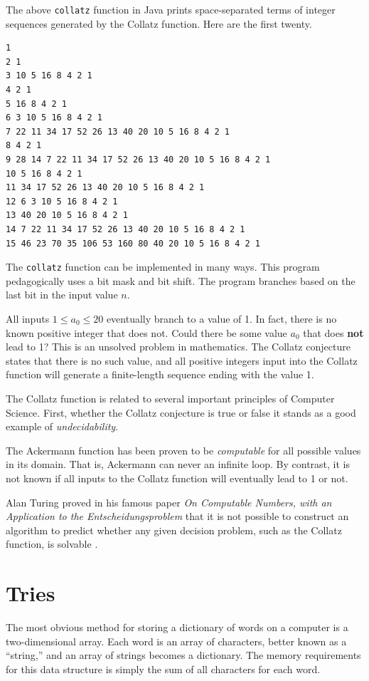 \documentclass{book}
\begin{document}
The above \texttt{collatz} function in Java prints space-separated terms of integer sequences generated by the Collatz function. Here are the first twenty.

\begin{lstlisting}
1 
2 1 
3 10 5 16 8 4 2 1 
4 2 1 
5 16 8 4 2 1 
6 3 10 5 16 8 4 2 1 
7 22 11 34 17 52 26 13 40 20 10 5 16 8 4 2 1 
8 4 2 1 
9 28 14 7 22 11 34 17 52 26 13 40 20 10 5 16 8 4 2 1 
10 5 16 8 4 2 1 
11 34 17 52 26 13 40 20 10 5 16 8 4 2 1 
12 6 3 10 5 16 8 4 2 1 
13 40 20 10 5 16 8 4 2 1 
14 7 22 11 34 17 52 26 13 40 20 10 5 16 8 4 2 1 
15 46 23 70 35 106 53 160 80 40 20 10 5 16 8 4 2 1 
\end{lstlisting}

The \texttt{collatz} function can be implemented in many ways. This program pedagogically uses a bit mask and bit shift. The program branches based on the last bit in the input value $n$.

All inputs $1 \le a_0 \le 20$ eventually branch to a value of 1. In fact, there is no known positive integer that does not. Could there be some value $a_0$ that does \textbf{not} lead to 1? This is an unsolved problem in mathematics. The Collatz conjecture states that there is no such value, and all positive integers input into the Collatz function will generate a finite-length sequence ending with the value 1.

The Collatz function is related to several important principles of Computer Science. First, whether the Collatz conjecture is true or false it stands as a good example of \textit{undecidability}. 

The Ackermann function has been proven to be \textit{computable} for all possible values in its domain. That is, Ackermann can never an infinite loop. By contrast, it is not known if all inputs to the Collatz function will eventually lead to 1 or not.

Alan Turing proved in his famous paper \textit{On Computable Numbers, with an Application to the Entscheidungsproblem} that it is not possible to construct an algorithm to predict whether any given decision problem, such as the Collatz function, is solvable \cite{turing1937computable}.

\chapter{Tries}

The most obvious method for storing a dictionary of words on a computer is a two-dimensional array. Each word is an array of characters, better known as a ``string,'' and an array of strings becomes a dictionary. The memory requirements for this data structure is simply the sum of all characters for each word.
\end{document}
